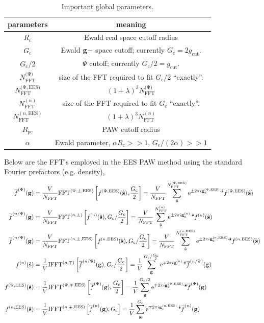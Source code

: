 \documentclass[paper=a4, fontsize=11pt]{article} %
\numberwithin{equation}{section} %
\numberwithin{figure}{section} %
\numberwithin{table}{section} %
\newcommand{\ol}{\overline}
\newcommand{\bs}{{\bf{s}}}
\newcommand{\bg}{{\bf{g}}}
\newcommand{\hs}{{\hat{\bf{s}}}}
\newcommand{\rEES}{{\mathrm{EES}}}
\newcommand{\rcut}{{\mathrm{cut}}}
\newcommand{\re}{{\mathrm{e}}}
\newcommand{\gcn}{{\bg_c^{(n)}}}
\newcommand{\gcpEES}{{\bg_c^{(\Psi,\rEES)}}}
\newcommand{\gcnEES}{{\bg_c^{(n,\rEES)}}}
\newcommand{\igcns}{2\pi i\gcn\cdot\hat \bs}
\newcommand{\igcps}{2\pi i\gcpEES\cdot\hat \bs}
\newcommand{\igcnEESs}{2\pi i\gcnEES\cdot\hat \bs}
\newcommand{\al}{{\alpha}}
\newcommand{\NFFT}{{N_{\mathrm{FFT}}}}
\newcommand{\NFFTn}{{N^{(n)}_{\mathrm{FFT}}}}
\newcommand{\NFFTp}{{N^{\mathrm{(\Psi})}_{\mathrm{FFT}}}}
\newcommand{\NFFTnEES}{{N^{(n,\rEES)}_{\mathrm{FFT}}}}
\newcommand{\NFFTpEES}{{N^{\mathrm{(\Psi,\rEES})}_{\mathrm{FFT}}}}
\newcommand{\Rc}{{R_{\mathrm{c}}}}
\newcommand{\Gc}{{G_{\mathrm{c}}}}
\newcommand{\hGc}{{\frac{G_{\mathrm{c}}}{2}}}
\newcommand{\Rpc}{{R_{\mathrm{pc}}}}
\newcommand{\FFTnm}{{\mathrm{FFT}^{(n,\pm)}}}
\newcommand{\FFTnmEES}{{\mathrm{FFT}^{(n,\pm,\rEES)}}}
\newcommand{\FFTpmEES}{{\mathrm{FFT}^{(\Psi,\pm,\rEES)}}}
\newcommand{\IFFTnm}{{\mathrm{IFFT}^{(n,\mp)}}}
\newcommand{\IFFTnmEES}{{\mathrm{IFFT}^{(n,\mp,\rEES)}}}
\newcommand{\IFFTpmEES}{{\mathrm{IFFT}^{(\Psi,\mp,\rEES)}}}
\begin{document}
\begin{table}[h!]
\caption{\label{index1} Important global parameters.}
\begin{center}
\begin{tabular}{ c c}
  \hline\hline
  parameters & meaning \\
  \hline
  $\Rc$ & Ewald real space cutoff radius \\
  $\Gc$ & Ewald $\bg-$ space cutoff; currently $\Gc = 2g_\rcut$. \\
  $\Gc/2$ & $\Psi$ cutoff; currently $\Gc/2 = g_\rcut$. \\
  $\NFFTp$ & size of the FFT required to fit $\Gc/2$ ``exactly''.\\
  $\NFFTpEES$ & $(1+\lambda)^3\NFFTp$ \\
  $\NFFTn$ & size of the FFT required to fit $\Gc$ ``exactly''.\\
  $\NFFTnEES$ & $(1+\lambda)^3\NFFTn$ \\
  $\Rpc$ & PAW cutoff radius \\
  $\alpha$ & Ewald parameter, $\al \Rc >> 1$, $\Gc/(2\al) >> 1$ \\
  \hline\hline
\end{tabular}
\end{center}
\end{table}
Below are the FFT's employed in the EES PAW method using the standard Fourier prefactors (e.g. density),
\begin{equation}\label{eq:FFTdef}
\begin{split}
\ol f^{(\Psi)}(\bg) &= \frac{V}{\NFFT}\FFTpmEES \left[f^{(\Psi,\rEES)}(\hs),\hGc\right]= \frac{V}{\NFFT}\sum_{\hs}^\NFFTpEES \re^{\pm \igcps} f^{(\Psi,\rEES)}(\hs)\\
\ol f^{(n/\Psi)}(\bg) &= \frac{V}{\NFFT}\FFTnm \left[f^{(n)}(\hs),\Gc/\hGc\right]= \frac{V}{\NFFT}\sum_{\hs}^\NFFTn \re^{\pm\igcns} f^{(n)}(\hs)\\
\ol f^{(n/\Psi)}(\bg) &= \frac{V}{\NFFT}\FFTnmEES \left[f^{(n,\rEES)}(\hs),\Gc/\hGc\right]= \frac{V}{\NFFT}\sum_{\hs}^\NFFTnEES \re^{\pm\igcnEESs} f^{(n,\rEES)}(\hs)\\
f^{(n)}(\hs) &= \frac{1}{V}\IFFTnm\left[\ol f^{(n/\Psi)}(\bg),\Gc/\hGc\right]=\frac{1}{V}\sum_{\bg}^{\Gc/\hGc} \re^{\mp\igcns} \ol f^{(n/\Psi)}(\bg)\\
f^{(\Psi,\rEES)}(\hs) &= \frac{1}{V}\IFFTpmEES\left[\ol f^{(\Psi)}(\bg),\hGc\right]=\frac{1}{V}\sum_{\bg}^{\Gc/2} \re^{\mp\igcps} \ol f^{(\Psi)}(\bg)\\
f^{(n,\rEES)}(\hs) &= \frac{1}{V}\IFFTnmEES\left[\ol f^{(n)}(\bg),\Gc\right]=\frac{1}{V}\sum_{\bg}^{\Gc} \re^{\mp\igcnEESs} \ol f^{(n)}(\bg)\\
\end{split}
\end{equation}
\end{document}
